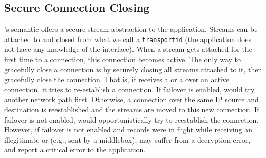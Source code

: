 

\subsection{Secure Connection Closing}
\tcpls's semantic offers a secure stream abstraction to the application.
Streams can be attached to and closed from what we call a \texttt{transportid}
(the application does not have any knowledge of the \tcp interface). When a
stream gets attached for the first time to a \tcp connection, this connection
becomes active. The only way to gracefully
close a \tcp connection is by securely closing all
streams attached to it, then \tcpls gracefully close the \tcp
connection. That is, if \tcpls receives a \rst or a \fin over an active \tcp
connection, it tries to re-establish
a \tcp connection. If failover is enabled, \tcpls would try another
network path first. Otherwise, a connection over the same
IP source and destination is
reestablished and the streams are moved to this new \tcp
connection. If failover is not enabled, \tcpls would opportunistically try to
reestablish the connection. However, if failover is not enabled and
records were in flight while receiving an illegitimate \rst or \fin
(e.g., sent by a middlebox), \tcpls may suffer from a decryption error, and report a critical
error to the application.




